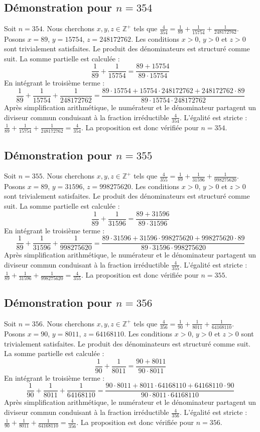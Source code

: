 \documentclass[11pt,a4paper]{article}
\begin{document}
\subsection{Démonstration pour $n = 354$}
Soit $n = 354$. Nous cherchons $x, y, z \in \mathbb{Z}^{+}$ tels que $\frac{4}{354} = \frac{1}{89} + \frac{1}{15754} + \frac{1}{248172762}$.
Posons $x = 89$, $y = 15754$, $z = 248172762$.
Les conditions $x > 0$, $y > 0$ et $z > 0$ sont trivialement satisfaites.
Le produit des dénominateurs est structuré comme suit. La somme partielle est calculée :
$$ \frac{1}{89} + \frac{1}{15754} = \frac{89+15754}{89 \cdot 15754} $$
En intégrant le troisième terme :
$$ \frac{1}{89} + \frac{1}{15754} + \frac{1}{248172762} = \frac{89 \cdot 15754 + 15754 \cdot 248172762 + 248172762 \cdot 89}{89 \cdot 15754 \cdot 248172762} $$
Après simplification arithmétique, le numérateur et le dénominateur partagent un diviseur commun conduisant à la fraction irréductible $\frac{4}{354}$.
L'égalité est stricte : $\frac{1}{89} + \frac{1}{15754} + \frac{1}{248172762} = \frac{4}{354}$.
La proposition est donc vérifiée pour $n = 354$.
\subsection{Démonstration pour $n = 355$}
Soit $n = 355$. Nous cherchons $x, y, z \in \mathbb{Z}^{+}$ tels que $\frac{4}{355} = \frac{1}{89} + \frac{1}{31596} + \frac{1}{998275620}$.
Posons $x = 89$, $y = 31596$, $z = 998275620$.
Les conditions $x > 0$, $y > 0$ et $z > 0$ sont trivialement satisfaites.
Le produit des dénominateurs est structuré comme suit. La somme partielle est calculée :
$$ \frac{1}{89} + \frac{1}{31596} = \frac{89+31596}{89 \cdot 31596} $$
En intégrant le troisième terme :
$$ \frac{1}{89} + \frac{1}{31596} + \frac{1}{998275620} = \frac{89 \cdot 31596 + 31596 \cdot 998275620 + 998275620 \cdot 89}{89 \cdot 31596 \cdot 998275620} $$
Après simplification arithmétique, le numérateur et le dénominateur partagent un diviseur commun conduisant à la fraction irréductible $\frac{4}{355}$.
L'égalité est stricte : $\frac{1}{89} + \frac{1}{31596} + \frac{1}{998275620} = \frac{4}{355}$.
La proposition est donc vérifiée pour $n = 355$.
\subsection{Démonstration pour $n = 356$}
Soit $n = 356$. Nous cherchons $x, y, z \in \mathbb{Z}^{+}$ tels que $\frac{4}{356} = \frac{1}{90} + \frac{1}{8011} + \frac{1}{64168110}$.
Posons $x = 90$, $y = 8011$, $z = 64168110$.
Les conditions $x > 0$, $y > 0$ et $z > 0$ sont trivialement satisfaites.
Le produit des dénominateurs est structuré comme suit. La somme partielle est calculée :
$$ \frac{1}{90} + \frac{1}{8011} = \frac{90+8011}{90 \cdot 8011} $$
En intégrant le troisième terme :
$$ \frac{1}{90} + \frac{1}{8011} + \frac{1}{64168110} = \frac{90 \cdot 8011 + 8011 \cdot 64168110 + 64168110 \cdot 90}{90 \cdot 8011 \cdot 64168110} $$
Après simplification arithmétique, le numérateur et le dénominateur partagent un diviseur commun conduisant à la fraction irréductible $\frac{4}{356}$.
L'égalité est stricte : $\frac{1}{90} + \frac{1}{8011} + \frac{1}{64168110} = \frac{4}{356}$.
La proposition est donc vérifiée pour $n = 356$.
\end{document}
